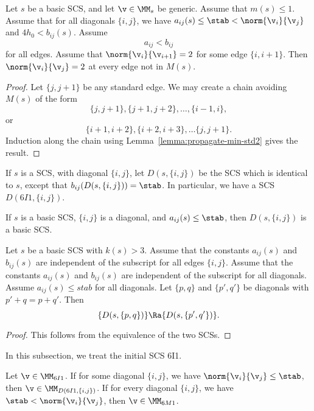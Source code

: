 \begin{lemma}\label{lemma:propagate-min-std3}
Let $s$ be a basic SCS, and let $\v\in \MM_s$ be generic.   Assume that $m(s)\le 1$.  
Assume that
for all diagonals $\{i,j\}$, we have
$a_{ij}(s)\le \stab < \norm{\v_i}{\v_j}$ and $4h_0 < b_{ij}(s)$.
Assume
\[
a_{ij} < b_{ij}
\]
for all edges.
Assume that $\norm{\v_i}{\v_{i+1}}=2$ for some edge $\{i,i+1\}$.  
Then $\norm{\v_i}{\v_j}=2$ at every  edge not in $M(s)$.
\end{lemma}

\begin{proof}  Let $\{j,j+1\}$ be any standard edge.  We may create a chain avoiding $M(s)$ of the form
\[
\{j,j+1\}, \{j+1,j+2\},\ldots, \{i-1,i\},
\]
or 
\[
\{i+1,i+2\}, \{i+2,i+3\},\ldots \{j,j+1\}.
\]
Induction along the chain using Lemma~\ref{lemma:propagate-min-std2} gives the result.
\end{proof}


If $s$ is a SCS,
with  diagonal $\{i,j\}$, let $D(s,\{i,j\})$ be the SCS which is identical to $s$, except that
$b_{ij}(D(s,\{i,j\})) =\stab$.   In particular, we have a SCS $D(6I1,\{i,j\})$.

\begin{lemma}
If $s$ is a basic SCS, $\{i,j\}$ is a diagonal, and
$a_{ij}(s)\le\stab$, then $D(s,\{i,j\})$ is a basic SCS.
\end{lemma}


\begin{lemma}\label{lemma:equivalent-diagonal}
Let $s$ be a basic SCS with $k(s)>3$.  
Assume that the constants $a_{ij}(s)$ and $b_{ij}(s)$ are independent of
the subscript for all edges $\{i,j\}$.  Assume that the constants
$a_{ij}(s)$ and $b_{ij}(s)$ are independent of the subscript for all diagonals.
Assume $a_{ij}(s)\le stab$ for all diagonals.
Let $\{p,q\}$ and $\{p',q'\}$ be diagonals with $p'+q = p+q'$.
Then
\[
\{D(s,\{p,q\})\} \Ra \{D(s,\{p',q'\})\}.
\]
\end{lemma}

\begin{proof}  This follows from the equivalence of the two SCSs.
\end{proof}


In this subsection, we treat the initial SCS 6I1.




\begin{lemma}[] Let $\v\in \MM_{6I1}$.  If for some diagonal $\{i,j\}$, we have $\norm{\v_i}{\v_j}\le \stab$,
then $\v\in \MM_{D(6I1,\{i,j\})}$.  If for every diagonal $\{i,j\}$, we have $\stab < \norm{\v_i}{\v_j}$, then
$\v \in \MM_{6M1}$.
\end{lemma}

